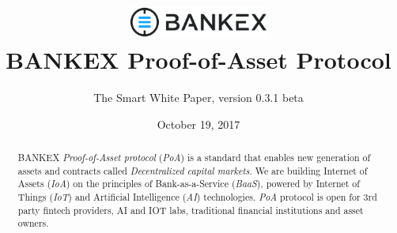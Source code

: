 \documentclass{article}
\title{\vspace{-3.85em}\includegraphics[width=0.35\textwidth]{logo.pdf} \\ \vspace{24pt} BANKEX Proof-of-Asset Protocol}
\author{The Smart White Paper, version 0.3.1 beta}
\date{October 19, 2017}
\begin{document}
\maketitle

\begin{abstract}
BANKEX \textit{Proof-of-Asset protocol} (\textit{PoA}) is a standard that enables new generation of assets and contracts called \textit{Decentralized capital markets}. We are building Internet of Assets (\textit{IoA}) on the principles of Bank-as-a-Service (\textit{BaaS}), powered by Internet of Things (\textit{IoT}) and Artificial Intelligence (\textit{AI}) technologies. \textit{PoA} protocol is open for 3rd party fintech providers, AI and IOT labs, traditional financial institutions and asset owners.
\end{abstract}

\vspace{24pt}
\end{document}
